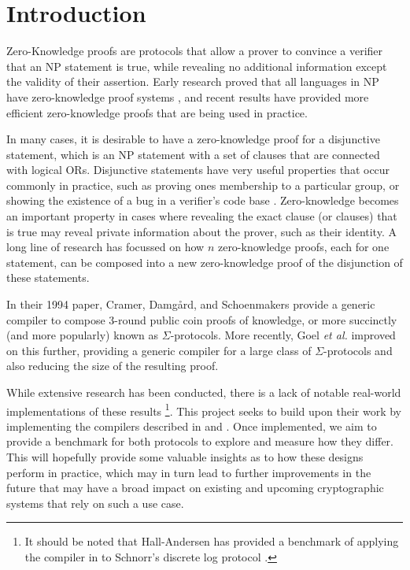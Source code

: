 \section{Introduction}

Zero-Knowledge proofs \cite{GMR85} are protocols that allow a prover to convince a verifier that an NP statement is true, while revealing no additional information except the validity of their assertion. Early research proved that all languages in NP have zero-knowledge proof systems \cite{DBLP:conf/focs/GoldreichMW86}, and recent results have provided more efficient zero-knowledge proofs that are being used in practice. 

In many cases, it is desirable to have a zero-knowledge proof for a disjunctive statement, which is an NP statement with a set of clauses that are connected with logical ORs. Disjunctive statements have very useful properties that occur commonly in practice, such as proving ones membership to a particular group, or showing the existence of a bug in a verifier's code base \cite{StackedGF}. Zero-knowledge becomes an important property in cases where revealing the exact clause (or clauses) that is true may reveal private information about the prover, such as their identity. A long line of research has focussed on how $n$ zero-knowledge proofs, each for one statement, can be composed into a new zero-knowledge proof of the disjunction of these statements. 

In their 1994 paper, Cramer, Damg{\aa}rd, and Schoenmakers \cite{CDS94} provide a generic compiler to compose 3-round public coin proofs of knowledge, or more succinctly (and more popularly) known as $\Sigma$-protocols. %
More recently, Goel {\em et al.} \cite{StackingSigmas} improved on this further, providing a generic compiler for a large class of $\Sigma$-protocols and also reducing the size of the resulting proof. 

While extensive research has been conducted, there is a lack of notable real-world implementations of these results
\footnote{It should be noted that Hall-Andersen \cite{MHAStackSig} has provided a benchmark of applying the compiler in \cite{StackingSigmas} to Schnorr's discrete log protocol \cite{Schnorr}.}. This project seeks to build upon their work by implementing the compilers described in \cite{CDS94} and \cite{StackingSigmas}. Once implemented, we aim to provide a benchmark for both protocols to explore and measure how they differ. This will hopefully provide some valuable insights as to how these designs perform in practice, which may in turn lead to further improvements in the future that may have a broad impact on existing and upcoming cryptographic systems that rely on such a use case. 

